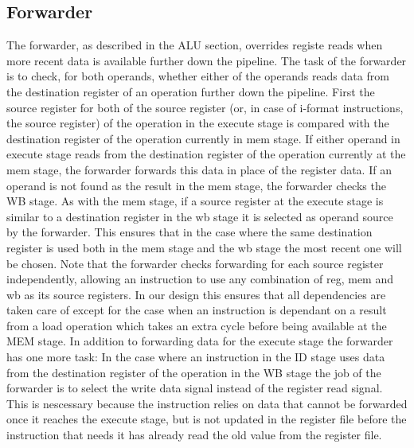 \subsection{Forwarder}
\label{section:Forwarder}
The forwarder, as described in the ALU section, overrides registe reads when more recent data is available further down the pipeline.
The task of the forwarder is to check, for both operands, whether either of the operands reads data from the destination register of an operation further down the pipeline.
First the source register for both of the source register (or, in case of i-format instructions, the source register) of the operation in the execute stage is compared with the destination register of the operation currently in mem stage. 
If either operand in execute stage reads from the destination register of the operation currently at the mem stage, the forwarder forwards this data in place of the register data.
If an operand is not found as the result in the mem stage, the forwarder checks the WB stage.
As with the mem stage, if a source register at the execute stage is similar to a destination register in the wb stage it is selected as operand source by the forwarder. 
This ensures that in the case where the same destination register is used both in the mem stage and the wb stage the most recent one will be chosen.
Note that the forwarder checks forwarding for each source register independently, allowing an instruction to use any combination of reg, mem and wb as its source registers.
In our design this ensures that all dependencies are taken care of except for the case when an instruction is dependant on a result from a load operation which takes an extra cycle before being available at the MEM stage.
In addition to forwarding data for the execute stage the forwarder has one more task:
In the case where an instruction in the ID stage uses data from the destination register of the operation in the WB stage the job of the forwarder is to select the write data signal instead of the register read signal.
This is nescessary because the instruction relies on data that cannot be forwarded once it reaches the execute stage, but is not updated in the register file before the instruction that needs it has already read the old value from the register file.

